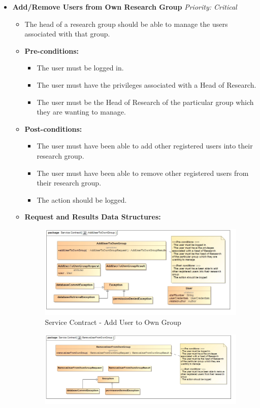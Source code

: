 \documentclass{article}
\begin{document}
				\begin{itemize}
					\item \textbf{Add/Remove Users from Own Research Group} \hfill \textit{Priority: Critical}
					\begin{itemize}
						\item The head of a research group should be able to manage the users associated with that group.
						\item \textbf{Pre-conditions:}
						\begin{itemize}
							\item The user must be logged in.
							\item The user must have the privileges associated with a Head of Research.
							\item The user must be the Head of Research of the particular group which they are wanting to manage.
						\end{itemize}
						\item \textbf{Post-conditions:}
						\begin{itemize}
							\item The user must have been able to add other registered users into their research group.
							\item The user must have been able to remove other registered users from their research group.
							\item The action should be logged.
						\end{itemize}
						\item \textbf{Request and Results Data Structures:}
						\begin{figure}[H]
							\includegraphics[width=\linewidth]{../Diagrams/ServiceContracts/User subsystem/AddUserToOwnGroup.jpg}
							\caption{Service Contract - Add User to Own Group}
						\end{figure}
						\begin{figure}[H]
							\includegraphics[width=\linewidth]{../Diagrams/ServiceContracts/User subsystem/RemoveUserFromOwnGroup.jpg}

\end{figure}
\end{itemize}
\end{itemize}
\end{document}
